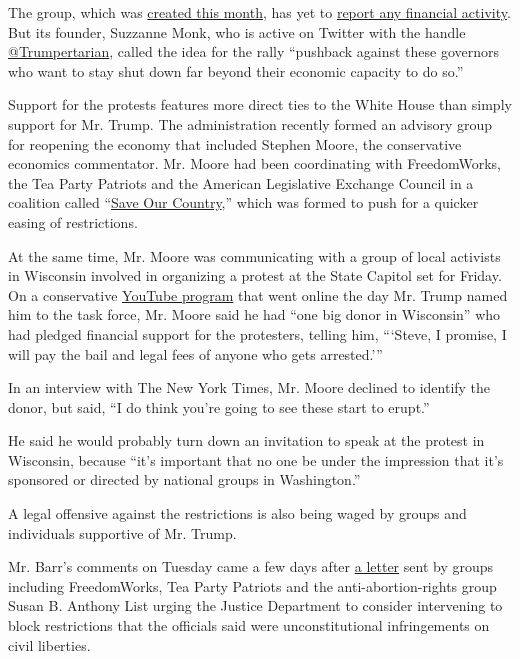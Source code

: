 The group, which was
\href{https://docquery.fec.gov/cgi-bin/forms/C00742890/1402019/}{created
this month}, has yet to
\href{https://docquery.fec.gov/pdf/091/202004159219312091/202004159219312091.pdf}{report
any financial activity}. But its founder, Suzzanne Monk, who is active
on Twitter with the handle
\href{https://twitter.com/Trumpertarian}{@Trumpertarian}, called the
idea for the rally ``pushback against these governors who want to stay
shut down far beyond their economic capacity to do so.''

Support for the protests features more direct ties to the White House
than simply support for Mr. Trump. The administration recently formed an
advisory group for reopening the economy that included Stephen Moore,
the conservative economics commentator. Mr. Moore had been coordinating
with FreedomWorks, the Tea Party Patriots and the American Legislative
Exchange Council in a coalition called
``\href{https://www.washingtonpost.com/business/2020/04/13/trump-reopen-economy-conservative-groups-coronavirus/}{Save
Our Country},'' which was formed to push for a quicker easing of
restrictions.

At the same time, Mr. Moore was communicating with a group of local
activists in Wisconsin involved in organizing a protest at the State
Capitol set for Friday. On a conservative
\href{https://www.youtube.com/watch?v=2h7czFYx6-s\&feature=youtu.be\&t=856}{YouTube
program} that went online the day Mr. Trump named him to the task force,
Mr. Moore said he had ``one big donor in Wisconsin'' who had pledged
financial support for the protesters, telling him, ```Steve, I promise,
I will pay the bail and legal fees of anyone who gets arrested.'''

In an interview with The New York Times, Mr. Moore declined to identify
the donor, but said, ``I do think you're going to see these start to
erupt.''

He said he would probably turn down an invitation to speak at the
protest in Wisconsin, because ``it's important that no one be under the
impression that it's sponsored or directed by national groups in
Washington.''

A legal offensive against the restrictions is also being waged by groups
and individuals supportive of Mr. Trump.

Mr. Barr's comments on Tuesday came a few days after
\href{https://www.documentcloud.org/documents/6842227-Trump-Allies-Call-On-DOJ-To-Block-State.html}{a
letter} sent by groups including FreedomWorks, Tea Party Patriots and
the anti-abortion-rights group Susan B. Anthony List urging the Justice
Department to consider intervening to block restrictions that the
officials said were unconstitutional infringements on civil liberties.


